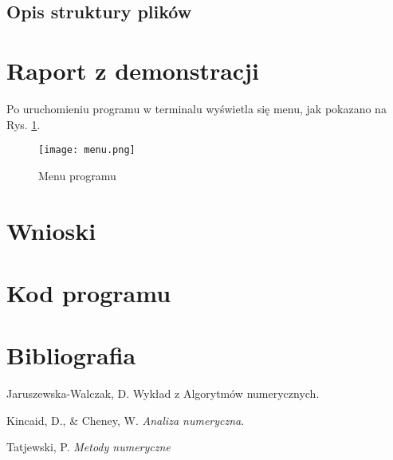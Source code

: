 \documentclass[12pt]{article}
\begin{document}
\subsection{Opis struktury plików}

\section{Raport z demonstracji}
\label{sec:raport}
Po uruchomieniu programu w terminalu wyświetla się menu, jak pokazano na Rys. \ref{fig:menu}.

\begin{figure}[H]
\centering
\texttt{[image: menu.png]}
\caption{Menu programu}
\label{fig:menu}
\end{figure}
\section{Wnioski}
\section{Kod programu}
\section*{Bibliografia}
\begin{thebibliography}{}
	
Jaruszewska-Walczak, D. Wykład z Algorytmów numerycznych.

Kincaid, D., \& Cheney, W. \emph{Analiza numeryczna}.

Tatjewski, P. \emph{Metody numeryczne}
	
\end{thebibliography}
\end{document}
